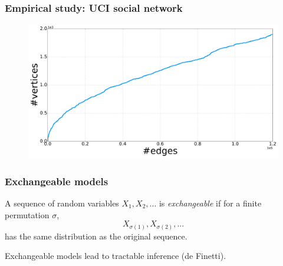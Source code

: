 \documentclass[final,hyperref={pdfpagelabels=false},noamsthm]{beamer}
\begin{document}
\begin{frame}
	\frametitle{Empirical study: UCI social network}
	\begin{figure}[h]
		\includegraphics[width=1.0\textwidth]{fig/n_CollegeMsg_arrival.pdf}
	\end{figure}
\end{frame}

%	
%	

\begin{frame}
	\frametitle{Exchangeable models}
	A sequence of random variables $X_1, X_2, ...$ is \textit{exchangeable} if for a finite permutation $\sigma$,
	\begin{equation*}
		X_{\sigma(1)}, X_{\sigma(2)}, ...
	\end{equation*}
	has the same distribution as the original sequence.
	
	\vspace{20pt}
	Exchangeable models lead to tractable inference (de Finetti).
\end{frame}
\end{document}
